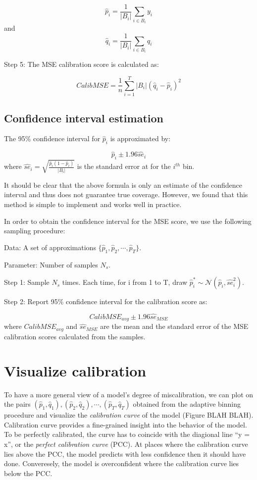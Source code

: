 $$\hat{p}_i = \frac{1}{|B_i|}\sum_{i \in B_i}y_i$$ and
$$\hat{q}_i = \frac{1}{|B_i|}\sum_{i \in B_i}q_i$$

Step 5: The MSE calibration score is calculated as:

$$CalibMSE = \frac{1}{n}\sum_{i=1}^T|B_i|(\hat{q}_i - \hat{p}_i)^2$$

\subsection{Confidence interval estimation}

The 95\% confidence interval for $\hat{p}_i$ is approximated by:

$$\hat{p}_i \pm 1.96 \hat{se}_i$$ where $\hat{se}_i = \sqrt{\frac{\hat{p}_i\left(1 - \hat{p}_i\right)}{|B_i|}}$ is the standard error at for the $i^{th}$ bin.

It should be clear that the above formula is only an estimate of the confidence interval and thus does not guarantee true coverage. However, we found that this method is simple to implement and works well in practice.

In order to obtain the confidence interval for the MSE score, we use the following sampling procedure:

Data: A set of approximations $\{\hat{p}_1, \hat{p}_2, \cdots, \hat{p}_T\}$.

Parameter: Number of samples $N_{s}$.

Step 1: Sample $N_{s}$ times. Each time, for i from 1 to T, draw $\hat{p}^*_i \sim \mathcal{N}\left(\hat{p}_i, \hat{se}^2_i\right)$.   

Step 2: Report 95\% confidence interval for the calibration score as:

$$CalibMSE_{avg} \pm 1.96\hat{se}_{MSE}$$ where $CalibMSE_{avg}$ and $\hat{se}_{MSE}$ are the mean and the standard error of the MSE calibration scores calculated from the samples. 

\section{Visualize calibration}

To have a more general view of a model's degree of miscalibration, we can plot on the pairs $(\hat{p}_1, \hat{q}_1), (\hat{p}_2, \hat{q}_2), \cdots, (\hat{p}_T, \hat{q}_T)$ obtained from the adaptive binning procedure and visualize the \textit{calibration curve} of the model (Figure BLAH BLAH). Calibration curve provides a fine-grained insight into the behavior of the model. To be perfectly calibrated, the curve has to coincide with the diagional line ``y = x'', or the \textit{perfect calibration curve} (PCC). At places where the calibration curve lies above the PCC, the model predicts with less confidence then it should have done. Converesely, the model is overconfident where the calibration curve lies below the PCC.

